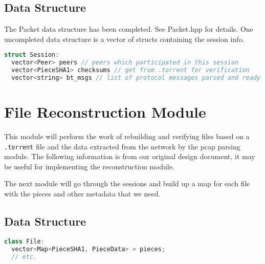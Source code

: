 \documentclass[11pt,titlepage]{article}
\begin{document}
\subsection{Data Structure}
The Packet data structure has been completed. See Packet.hpp for details. One
uncompleted data structure is a vector of structs containing the session info.
\begin{lstlisting}[language=C++]
struct Session:
  vector<Peer> peers // peers which participated in this session
  vector<PieceSHA1> checksums // get from .torrent for verification
  vector<string> bt_msgs // list of protocol messages parsed and ready
\end{lstlisting}

\section{File Reconstruction Module}
This module will perform the work of rebuilding and verifying files based on a 
\texttt{.torrent} file and the data extracted from the network by the pcap 
parsing module. The following information is from our original design document, 
it may be useful for implementing the reconstruction module.

The next module will go through the sessions and build up a map for each file with
the pieces and other metadata that we need.

\subsection{Data Structure}
\begin{lstlisting}[language=C++]
class File:
  vector<Map<PieceSHA1, PieceData> > pieces;
  // etc.
\end{lstlisting}
\end{document}
